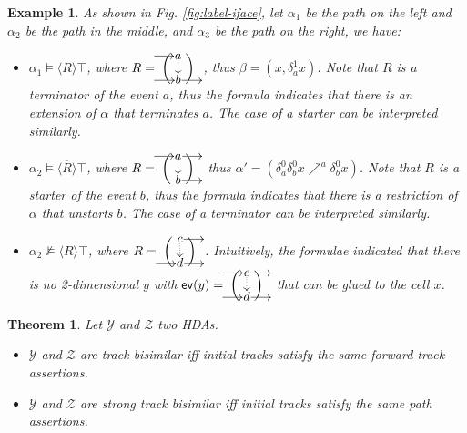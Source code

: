 \documentclass[11pt,a4paper,oldfontcommands]{memoir}
\makeatletter
\newcommand*\ev{\textup{\textsf{ev}}}
\newcommand\pomsetwop[4]{%
  \vcenter{\xymatrix@1@R=#1@C=#2@M=#3{#4}}%
}
\newcommand\ipomset[2][1.5]{%
  \hspace*{.6em}%
  \left(%
    \hspace*{-#1em}%
    \pomsetwop{2.7ex}{#1em}{1pt}{#2}%
    \hspace*{-#1em}%
  \right)%
  \hspace*{.6em}%
}
\newtheorem{example}[definition]{Example}
\newtheorem{theorem}[definition]{Theorem}
\makeatother
\begin{document}
\begin{example}
   As shown in Fig. \ref{fig:label-iface}, let $\alpha_1$ be the path on the left and $\alpha_2$ be the path in the middle, and $\alpha_3$ be the path on the right, we have:
\begin{itemize}
    \item $\alpha_1 \models  \langle  R \rangle \top$, where $R=\!\!\ipomset{ \ar[r] & a \ar@{.>}[d]
     & \\ \ar[r] & b \ar[r] &}$, thus $\beta= (x,\delta^1_a x)$. Note that $R$ is a terminator of the event $a$, thus the formula indicates that there is an extension of $\alpha$ that terminates $a$.  The case of a starter can be interpreted similarly.
     \item $\alpha_2 \models \overline{ \langle  R \rangle} \top$, where $R=\!\!\ipomset{ \ar[r] & a \ar@{.>}[d]  \ar[r]
     & \\  & b \ar[r] &}$ thus $\alpha'= (\delta_a^0 \delta_b^0 x \nearrow^{a } \delta_b^0 x)$. Note that $R$ is a starter of the event $b$, thus the formula indicates that there is a restriction of $\alpha$ that unstarts $b$.  The case of a terminator can be interpreted similarly.
     \item $\alpha_2 \nvDash  \langle  R \rangle \top$, where $R=\!\!\ipomset{  & c \ar@{.>}[d]  \ar[r]
     & \\ \ar[r] & d \ar[r] &}$. Intuitively, the formulae indicated that there is no 2-dimensional $y$ with $\ev(y)=\!\!\ipomset{ \ar[r] & c \ar@{.>}[d]  \ar[r]
     & \\ \ar[r] & d \ar[r] &}$ that can be glued to the cell $x$.
     
\end{itemize}

\end{example}

\begin{theorem} \cite{JOYAL1996164}
Let $\mathcal{Y}$ and $\mathcal{Z}$ two HDAs.
    \begin{itemize}
        \item $\mathcal{Y}$ and $\mathcal{Z}$ are track bisimilar iff initial tracks satisfy the same forward-track assertions. 
        \item $\mathcal{Y}$ and $\mathcal{Z}$ are strong track bisimilar iff initial tracks satisfy the same path assertions.
    \end{itemize}
\end{theorem}

\end{document}
